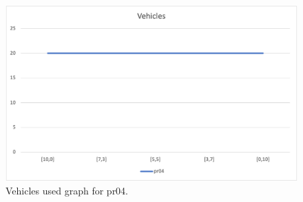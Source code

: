 \begin{figure}[H]
    \centering
    \includegraphics[width=1.0\columnwidth]{../graphs/pr04-vehicles.png}
    \caption{Vehicles used graph for pr04.}
\end{figure}
